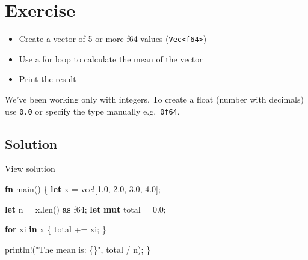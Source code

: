\documentclass[
  letterpaper,
  DIV=11,
  numbers=noendperiod,
  oneside]{scrreprt}
\newenvironment{Shaded}{\begin{snugshade}}{\end{snugshade}}
\newcommand{\ControlFlowTok}[1]{\textcolor[rgb]{0.00,0.23,0.31}{\textbf{#1}}}
\newcommand{\DataTypeTok}[1]{\textcolor[rgb]{0.68,0.00,0.00}{#1}}
\newcommand{\DecValTok}[1]{\textcolor[rgb]{0.68,0.00,0.00}{#1}}
\newcommand{\KeywordTok}[1]{\textcolor[rgb]{0.00,0.23,0.31}{\textbf{#1}}}
\newcommand{\NormalTok}[1]{\textcolor[rgb]{0.00,0.23,0.31}{#1}}
\newcommand{\OperatorTok}[1]{\textcolor[rgb]{0.37,0.37,0.37}{#1}}
\newcommand{\PreprocessorTok}[1]{\textcolor[rgb]{0.68,0.00,0.00}{#1}}
\newcommand{\StringTok}[1]{\textcolor[rgb]{0.13,0.47,0.30}{#1}}
\providecommand{\tightlist}{%
  \setlength{\itemsep}{0pt}\setlength{\parskip}{0pt}}\usepackage{longtable,booktabs,array}
\begin{document}
\section{Exercise}\label{exercise-4}

\begin{itemize}
\tightlist
\item
  Create a vector of 5 or more f64 values
  (\texttt{Vec\textless{}f64\textgreater{}})
\item
  Use a for loop to calculate the mean of the vector
\item
  Print the result
\end{itemize}

\begin{tcolorbox}[enhanced jigsaw, titlerule=0mm, coltitle=black, opacitybacktitle=0.6, bottomrule=.15mm, bottomtitle=1mm, colframe=quarto-callout-note-color-frame, toprule=.15mm, opacityback=0, rightrule=.15mm, leftrule=.75mm, breakable, left=2mm, colback=white, colbacktitle=quarto-callout-note-color!10!white, toptitle=1mm, title=\textcolor{quarto-callout-note-color}{\faInfo}\hspace{0.5em}{Note}, arc=.35mm]

We've been working only with integers. To create a float (number with
decimals) use \texttt{0.0} or specify the type manually
e.g.~\texttt{0f64}.

\end{tcolorbox}

\subsection{Solution}\label{solution-4}

View solution

\begin{Shaded}
\begin{Highlighting}[]
\KeywordTok{fn}\NormalTok{ main() }\OperatorTok{\{}
    \KeywordTok{let}\NormalTok{ x }\OperatorTok{=} \PreprocessorTok{vec!}\NormalTok{[}\DecValTok{1.0}\OperatorTok{,} \DecValTok{2.0}\OperatorTok{,} \DecValTok{3.0}\OperatorTok{,} \DecValTok{4.0}\NormalTok{]}\OperatorTok{;}

    \KeywordTok{let}\NormalTok{ n }\OperatorTok{=}\NormalTok{ x}\OperatorTok{.}\NormalTok{len() }\KeywordTok{as} \DataTypeTok{f64}\OperatorTok{;}
    \KeywordTok{let} \KeywordTok{mut}\NormalTok{ total }\OperatorTok{=} \DecValTok{0.0}\OperatorTok{;}

    \ControlFlowTok{for}\NormalTok{ xi }\KeywordTok{in}\NormalTok{ x }\OperatorTok{\{}
\NormalTok{        total }\OperatorTok{+=}\NormalTok{ xi}\OperatorTok{;}
    \OperatorTok{\}}

    \PreprocessorTok{println!}\NormalTok{(}\StringTok{"The mean is: \{\}"}\OperatorTok{,}\NormalTok{ total }\OperatorTok{/}\NormalTok{ n)}\OperatorTok{;}
\OperatorTok{\}}
\end{Highlighting}
\end{Shaded}
\end{document}
